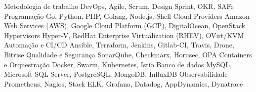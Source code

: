 \begin{cvskills}
  \cvskill
    {Metodologia de trabalho}
    {DevOps, Agile, Scrum, Design Sprint, OKR, SAFe}
  \cvskill
    {Programação}
    {Go, Python, PHP, Golang, Node.js, Shell}
  \cvskill
    {Cloud Providers}
    {Amazon Web Services (AWS), Google Cloud Platform (GCP), DigitalOcean, OpenStack}
  \cvskill
    {Hypervisors}
    {Hyper-V, RedHat Enterprise Virtualization (RHEV), OVirt/KVM}
  \cvskill
    {Automação e CI/CD}
    {Ansible, Terraform, Jenkins, Gitlab-CI, Travis, Drone, Bitrise}
  \cvskill
    {Qualidade e Segurança}
    {SonarQube, Checkmarx, Horusec, OPA}
  \cvskill
    {Containers e Orquestração}
    {Docker, Swarm, Kubernetes, Istio}
  \cvskill
    {Banco de dados}
    {MySQL, Microsoft SQL Server, PostgreSQL, MongoDB, InfluxDB}
  \cvskill
    {Observabilidade}
    {Prometheus, Nagios, Stack ELK, Grafana, Datadog, AppDynamics, Dynatrace}
\end{cvskills}
